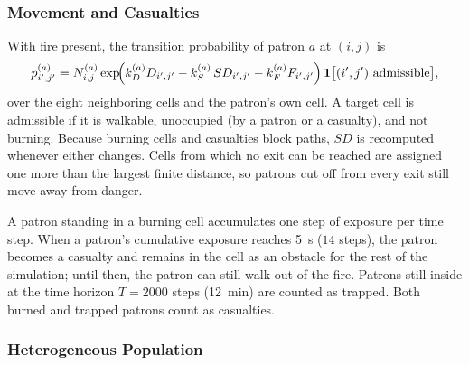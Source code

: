 \subsubsection{Movement and Casualties}\label{sec:fire_movement}

With fire present, the transition probability of patron $a$ at $(i, j)$ is
\begin{equation}\label{eq:trans_prob_fire}
  p^{(a)}_{i',j'} = N^{(a)}_{i,j}
  \exp\!\Bigl(k^{(a)}_D D_{i',j'} - k^{(a)}_S\, SD_{i',j'} - k^{(a)}_F F_{i',j'}\Bigr)
  \,\mathbf{1}\bigl[(i', j') \text{ admissible}\bigr],
\end{equation}
over the eight neighboring cells and the patron's own cell. A target cell is admissible if
it is walkable, unoccupied (by a patron or a casualty), and not burning. Because burning
cells and casualties block paths, $SD$ is recomputed whenever either changes. Cells from
which no exit can be reached are assigned one more than the largest finite distance, so
patrons cut off from every exit still move away from danger.

A patron standing in a burning cell accumulates one step of exposure per time step. When a
patron's cumulative exposure reaches \SI{5}{s} ($14$ steps), the patron becomes a
casualty and remains in the cell as an obstacle for the rest of the simulation; until
then, the patron can still walk out of the fire. Patrons still inside at the time horizon
$T = 2000$ steps (\SI{12}{min}) are counted as trapped. Both burned and trapped patrons
count as casualties.

\subsubsection{Heterogeneous Population}\label{sec:population}

